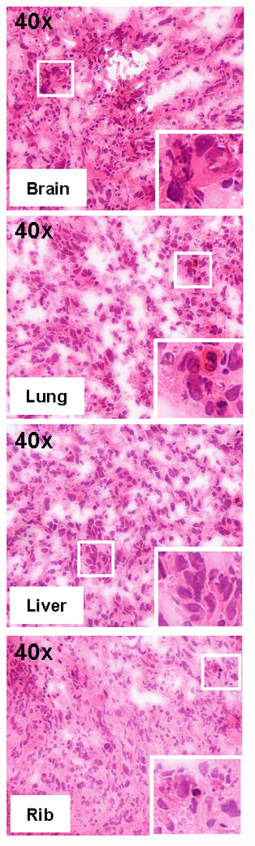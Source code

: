 \begin{figure}[htbp]
\begin{subfigure}{0.235\textwidth}
		\includegraphics[width=\textwidth,keepaspectratio]{images/303/histo}

\end{subfigure}
\end{figure}
